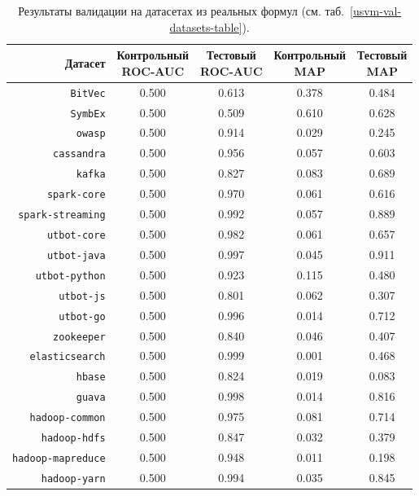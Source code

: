 \begin{table}[ht]
\begin{center}
\begin{tabular}{r|cc|cc}
    Датасет & \makecell{Контрольный \\ \textsc{ROC-AUC}} & \makecell{Тестовый \\ \textsc{ROC-AUC}} & \makecell{Контрольный \\ \textsc{MAP}} & \makecell{Тестовый \\ \textsc{MAP}} \\
    \hline \hline
    \rule{0pt}{2.5ex}
    \texttt{BitVec}           & 0.500 & 0.613 & 0.378 & 0.484 \\
    \texttt{SymbEx}           & 0.500 & 0.509 & 0.610 & 0.628 \\
    \hline
    \texttt{owasp}            & 0.500 & 0.914 & 0.029 & 0.245 \\
    \texttt{cassandra}        & 0.500 & 0.956 & 0.057 & 0.603 \\
    \texttt{kafka}            & 0.500 & 0.827 & 0.083 & 0.689 \\
    \texttt{spark-core}       & 0.500 & 0.970 & 0.061 & 0.616 \\
    \texttt{spark-streaming}  & 0.500 & 0.992 & 0.057 & 0.889 \\
    \texttt{utbot-core}       & 0.500 & 0.982 & 0.061 & 0.657 \\
    \texttt{utbot-java}       & 0.500 & 0.997 & 0.045 & 0.911 \\
    \texttt{utbot-python}     & 0.500 & 0.923 & 0.115 & 0.480 \\
    \texttt{utbot-js}         & 0.500 & 0.801 & 0.062 & 0.307 \\
    \texttt{utbot-go}         & 0.500 & 0.996 & 0.014 & 0.712 \\
    \texttt{zookeeper}        & 0.500 & 0.840 & 0.046 & 0.407 \\
    \texttt{elasticsearch}    & 0.500 & 0.999 & 0.001 & 0.468 \\
    \texttt{hbase}            & 0.500 & 0.824 & 0.019 & 0.083 \\
    \texttt{guava}            & 0.500 & 0.998 & 0.014 & 0.816 \\
    \texttt{hadoop-common}    & 0.500 & 0.975 & 0.081 & 0.714 \\
    \texttt{hadoop-hdfs}      & 0.500 & 0.847 & 0.032 & 0.379 \\
    \texttt{hadoop-mapreduce} & 0.500 & 0.948 & 0.011 & 0.198 \\
    \texttt{hadoop-yarn}      & 0.500 & 0.994 & 0.035 & 0.845 \\
\end{tabular}
\caption{\label{usvm-val-results-roc-auc-avg-prec} Результаты валидации на датасетах из реальных формул (см. таб.~\ref{usvm-val-datasets-table}).}
\end{center}
\end{table}


